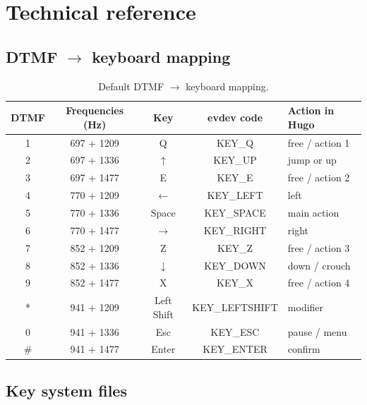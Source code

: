 \chapter{Technical reference}

\section{DTMF $\to$ keyboard mapping}

\begin{table}[h]
\centering
\begin{tabular}{ccccp{5cm}}
\toprule
\textbf{DTMF} & \textbf{Frequencies (Hz)} & \textbf{Key} & \textbf{evdev code} & \textbf{Action in Hugo} \\
\midrule
1 & 697 + 1209 & Q & KEY\_Q & free / action 1 \\
2 & 697 + 1336 & $\uparrow$ & KEY\_UP & jump or up \\
3 & 697 + 1477 & E & KEY\_E & free / action 2 \\
4 & 770 + 1209 & $\leftarrow$ & KEY\_LEFT & left \\
5 & 770 + 1336 & Space & KEY\_SPACE & main action \\
6 & 770 + 1477 & $\rightarrow$ & KEY\_RIGHT & right \\
7 & 852 + 1209 & Z & KEY\_Z & free / action 3 \\
8 & 852 + 1336 & $\downarrow$ & KEY\_DOWN & down / crouch \\
9 & 852 + 1477 & X & KEY\_X & free / action 4 \\
* & 941 + 1209 & Left Shift & KEY\_LEFTSHIFT & modifier \\
0 & 941 + 1336 & Esc & KEY\_ESC & pause / menu \\
\# & 941 + 1477 & Enter & KEY\_ENTER & confirm \\
\bottomrule
\end{tabular}
\caption{Default DTMF $\to$ keyboard mapping.}
\end{table}

\section{Key system files}

